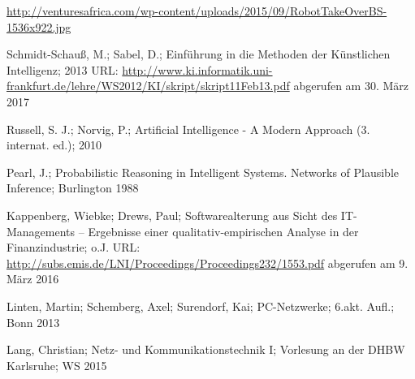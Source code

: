 \begin{thebibliography}{9999}

 \url{http://venturesafrica.com/wp-content/uploads/2015/09/RobotTakeOverBS-1536x922.jpg}

 Schmidt-Schauß, M.; Sabel, D.; Einführung in die Methoden der
Künstlichen Intelligenz; 2013 URL: \url{http://www.ki.informatik.uni-frankfurt.de/lehre/WS2012/KI/skript/skript11Feb13.pdf} abgerufen am 30. März 2017

 Russell, S. J.; Norvig, P.; Artificial Intelligence - A Modern Approach (3. internat. ed.); 2010

 Pearl, J.; Probabilistic Reasoning in Intelligent Systems. Networks of Plausible Inference;  Burlington 1988
 
 Kappenberg, Wiebke; Drews, Paul; Softwarealterung aus Sicht des IT-Managements – Ergebnisse einer qualitativ-empirischen Analyse in der Finanzindustrie; o.J. URL: \url{http://subs.emis.de/LNI/Proceedings/Proceedings232/1553.pdf} abgerufen am 9. März 2016

 Linten, Martin; Schemberg, Axel; Surendorf, Kai; PC-Netzwerke; 6.akt. Aufl.; Bonn 2013

 Lang, Christian; Netz- und Kommunikationstechnik I; Vorlesung an der DHBW Karlsruhe; WS 2015

\end{thebibliography}
